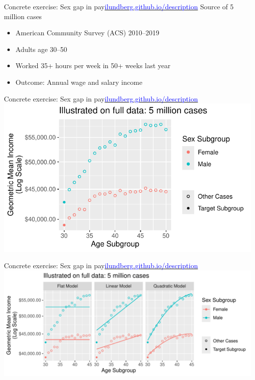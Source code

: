 \documentclass{beamer}
\begin{document}
\begin{frame}{Concrete exercise: Sex gap in pay}{\href{https://ilundberg.github.io/description/}{\textcolor{blue}{ilundberg.github.io/description}}}
Source of 5 million cases
\begin{itemize}
\item American Community Survey (ACS) 2010–2019
\item Adults age 30--50
\item Worked 35+ hours per week in 50+ weeks last year
\item Outcome: Annual wage and salary income
\end{itemize}
\end{frame}

\begin{frame}{Concrete exercise: Sex gap in pay}{\href{https://ilundberg.github.io/description/}{\textcolor{blue}{ilundberg.github.io/description}}}
\includegraphics[height = .7\textheight]{true_age_pattern}
\end{frame}

\begin{frame}{Concrete exercise: Sex gap in pay}{\href{https://ilundberg.github.io/description/}{\textcolor{blue}{ilundberg.github.io/description}}}
\includegraphics[width = \textwidth]{define_models}
\end{frame}
\end{document}

